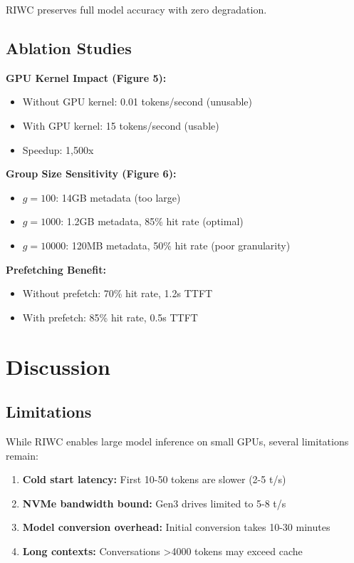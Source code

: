 \documentclass[twocolumn,10pt]{article}
\begin{document}
RIWC preserves full model accuracy with zero degradation.

\subsection{Ablation Studies}

\textbf{GPU Kernel Impact (Figure 5):}
\begin{itemize}
    \item Without GPU kernel: 0.01 tokens/second (unusable)
    \item With GPU kernel: 15 tokens/second (usable)
    \item Speedup: 1,500x
\end{itemize}

\textbf{Group Size Sensitivity (Figure 6):}
\begin{itemize}
    \item $g = 100$: 14GB metadata (too large)
    \item $g = 1000$: 1.2GB metadata, 85\% hit rate (optimal)
    \item $g = 10000$: 120MB metadata, 50\% hit rate (poor granularity)
\end{itemize}

\textbf{Prefetching Benefit:}
\begin{itemize}
    \item Without prefetch: 70\% hit rate, 1.2s TTFT
    \item With prefetch: 85\% hit rate, 0.5s TTFT
\end{itemize}

\section{Discussion}

\subsection{Limitations}

While RIWC enables large model inference on small GPUs, several limitations remain:

\begin{enumerate}
    \item \textbf{Cold start latency:} First 10-50 tokens are slower (2-5 t/s)
    \item \textbf{NVMe bandwidth bound:} Gen3 drives limited to 5-8 t/s
    \item \textbf{Model conversion overhead:} Initial conversion takes 10-30 minutes
    \item \textbf{Long contexts:} Conversations >4000 tokens may exceed cache
\end{enumerate}
\end{document}
